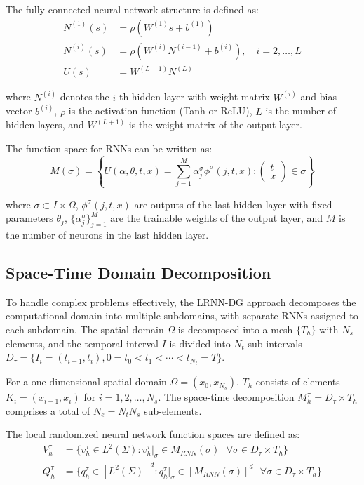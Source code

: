 \documentclass[11pt,a4paper]{article}
\begin{document}
The fully connected neural network structure is defined as:
\begin{align}
N^{(1)}(s) &= \rho(W^{(1)}s + b^{(1)}) \\
N^{(i)}(s) &= \rho(W^{(i)}N^{(i-1)} + b^{(i)}), \quad i = 2, \ldots, L \\
U(s) &= W^{(L+1)}N^{(L)}
\end{align}

where $N^{(i)}$ denotes the $i$-th hidden layer with weight matrix $W^{(i)}$ and bias vector $b^{(i)}$, $\rho$ is the activation function (Tanh or ReLU), $L$ is the number of hidden layers, and $W^{(L+1)}$ is the weight matrix of the output layer.

The function space for RNNs can be written as:
\begin{equation}
M(\sigma) = \left\{U(\alpha, \theta, t, x) = \sum_{j=1}^{M} \alpha_j^\sigma \phi^\sigma(j, t, x): \begin{pmatrix} t \\ x \end{pmatrix} \in \sigma \right\}
\end{equation}

where $\sigma \subset I \times \Omega$, $\phi^\sigma(j, t, x)$ are outputs of the last hidden layer with fixed parameters $\theta_j$, $\{\alpha_j^\sigma\}_{j=1}^{M}$ are the trainable weights of the output layer, and $M$ is the number of neurons in the last hidden layer.

\subsection{Space-Time Domain Decomposition}

To handle complex problems effectively, the LRNN-DG approach decomposes the computational domain into multiple subdomains, with separate RNNs assigned to each subdomain. The spatial domain $\Omega$ is decomposed into a mesh $\{T_h\}$ with $N_s$ elements, and the temporal interval $I$ is divided into $N_t$ sub-intervals $D_\tau = \{I_i = (t_{i-1}, t_i), 0 = t_0 < t_1 < \cdots < t_{N_t} = T\}$.

For a one-dimensional spatial domain $\Omega = (x_0, x_{N_s})$, $T_h$ consists of elements $K_i = (x_{i-1}, x_i)$ for $i = 1, 2, \ldots, N_s$. The space-time decomposition $M_h^\tau = D_\tau \times T_h$ comprises a total of $N_e = N_t N_s$ sub-elements.

The local randomized neural network function spaces are defined as:
\begin{align}
V_h^\tau &= \{v_h^\tau \in L^2(\Sigma) : v_h^\tau|_\sigma \in M_{RNN}(\sigma) \text{ } \forall \sigma \in D_\tau \times T_h\} \\
Q_h^\tau &= \{q_h^\tau \in [L^2(\Sigma)]^d : q_h^\tau|_\sigma \in [M_{RNN}(\sigma)]^d \text{ } \forall \sigma \in D_\tau \times T_h\}
\end{align}
\end{document}
